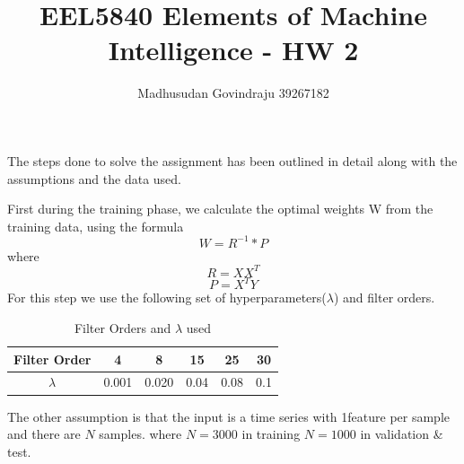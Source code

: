 \documentclass[10pt, letterpaper]{article}
\author{Madhusudan Govindraju 39267182 }
\date{}
\begin{document}
\title{EEL5840  Elements of Machine Intelligence - HW 2}
\maketitle

The steps done to solve the assignment has been outlined in detail along with the assumptions and the data used.


First during the training phase, we calculate the optimal weights W from the training data, using the formula $$ W = {R}^{-1} * P $$  where $$ R = XX^{T} $$ $$P = X^{T}Y$$ For this step we use the following set of  hyperparameters($\lambda$) and filter orders. 


\begin{table}[h!]
\begin{center}
\caption{Filter Orders and $\lambda$ used}
\label{table:hyper_parameters}
\begin{tabular}{ |c|c|c|c|c|c| }
\hline
\hline
Filter Order	& 4		& 8 		& 15 		& 25 		&30 \\
\hline
$\lambda$		&0.001 	& 0.020 	&0.04 	& 0.08 	&0.1\\
\hline
\end{tabular}
\end{center}
\end{table}

The other assumption is that the input is a time series with 1feature per sample and there are $N$ samples. where $N=3000$ in training $N=1000$ in validation \& test. 
\end{document}
